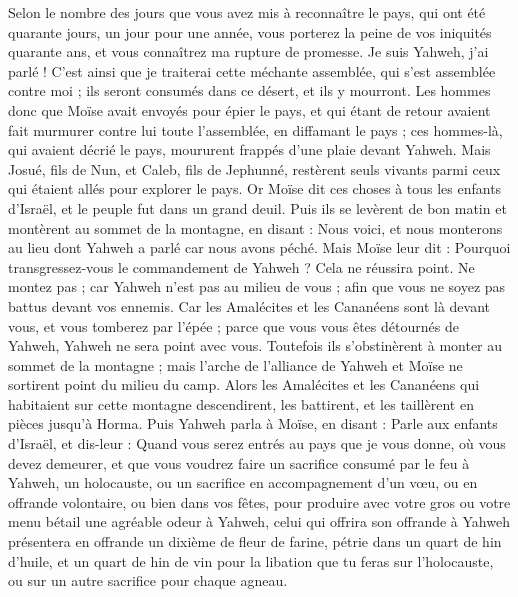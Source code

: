 \begin{multicols}{2}
Selon le nombre des jours que vous avez mis à reconnaître le pays, qui ont été quarante jours, un jour pour une année, vous porterez la peine de vos iniquités quarante ans, et vous connaîtrez ma rupture de promesse.
Je suis Yahweh, j'ai parlé ! C'est ainsi que je traiterai cette méchante assemblée, qui s'est assemblée contre moi ; ils seront consumés dans ce désert, et ils y mourront.
Les hommes donc que Moïse avait envoyés pour épier le pays, et qui étant de retour avaient fait murmurer contre lui toute l’assemblée, en diffamant le pays ;
ces hommes-là, qui avaient décrié le pays, moururent frappés d'une plaie devant Yahweh.
Mais Josué, fils de Nun, et Caleb, fils de Jephunné, restèrent seuls vivants parmi ceux qui étaient allés pour explorer le pays.
Or Moïse dit ces choses à tous les enfants d'Israël, et le peuple fut dans un grand deuil.
Puis ils se levèrent de bon matin et montèrent au sommet de la montagne, en disant : Nous voici, et nous monterons au lieu dont Yahweh a parlé car nous avons péché.
Mais Moïse leur dit : Pourquoi transgressez-vous le commandement de Yahweh ? Cela ne réussira point.
Ne montez pas ; car Yahweh n'est pas au milieu de vous ; afin que vous ne soyez pas battus devant vos ennemis.
Car les Amalécites et les Cananéens sont là devant vous, et vous tomberez par l'épée ; parce que vous vous êtes détournés de Yahweh, Yahweh ne sera point avec vous.
Toutefois ils s'obstinèrent à monter au sommet de la montagne ; mais l'arche de l'alliance de Yahweh et Moïse ne sortirent point du milieu du camp.
Alors les Amalécites et les Cananéens qui habitaient sur cette montagne descendirent, les battirent, et les taillèrent en pièces jusqu'à Horma.
\VerseOne{}Puis Yahweh parla à Moïse, en disant :
Parle aux enfants d'Israël, et dis-leur : Quand vous serez entrés au pays que je vous donne, où vous devez demeurer,
et que vous voudrez faire un sacrifice consumé par le feu à Yahweh, un holocauste, ou un sacrifice en accompagnement d'un vœu, ou en offrande volontaire, ou bien dans vos fêtes, pour produire avec votre gros ou votre menu bétail une agréable odeur à Yahweh,
celui qui offrira son offrande à Yahweh présentera en offrande un dixième de fleur de farine, pétrie dans un quart de hin d'huile,
et un quart de hin de vin pour la libation que tu feras sur l'holocauste, ou sur un autre sacrifice pour chaque agneau.

\end{multicols}
